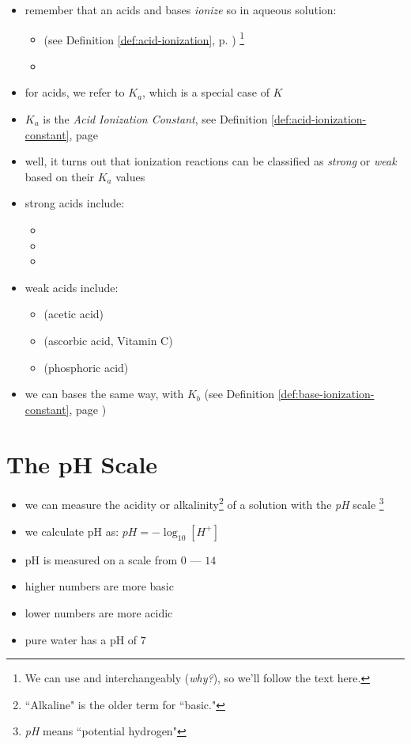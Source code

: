 \documentclass[11pt, oneside]{article}   	%
\begin{document}
\begin{itemize}
\item remember that an acids and bases \emph{ionize} so in aqueous solution:
\begin{itemize}
\item {}(see Definition \ref{def:acid-ionization}, p. \pageref{def:acid-ionization})
\footnote{We can use  and  interchangeably (\emph{why?}), so we'll follow the text here.}
\item {}
\end{itemize}
\item for acids, we refer to $K_{a}$, which is a special case of $K$
\item $K_{a}$ is the \emph{Acid Ionization Constant}, see Definition \ref{def:acid-ionization-constant}, page \pageref{def:acid-ionization-constant}
\item well, it turns out that ionization reactions can be classified as \emph{strong} or \emph{weak} based on their $K_{a}$ values
\item strong acids include:
\begin{itemize}
\item {}
\item {}
\item {}
\end{itemize}
\item weak acids include:
\begin{itemize}
\item {} (acetic acid)
\item {} (ascorbic acid, Vitamin C)
\item {} (phosphoric acid)
\end{itemize} 
\item we can bases the same way, with $K_{b}$ (see Definition \ref{def:base-ionization-constant}, page \pageref{def:base-ionization-constant})
\end{itemize}

\section{The pH Scale}

\begin{itemize}
\item we can measure the acidity or alkalinity\footnote{``Alkaline" is the older term for ``basic."} of a solution with the \emph{pH} scale
\footnote{\emph{pH} means ``potential hydrogen"}
\item we calculate pH as: $pH = - \log_{10} [H^{+}]$
\item pH is measured on a scale from $0$ --- $14$
\item higher numbers are more basic
\item lower numbers are more acidic
\item pure water has a pH of $7$
\end{itemize}
\end{document}
